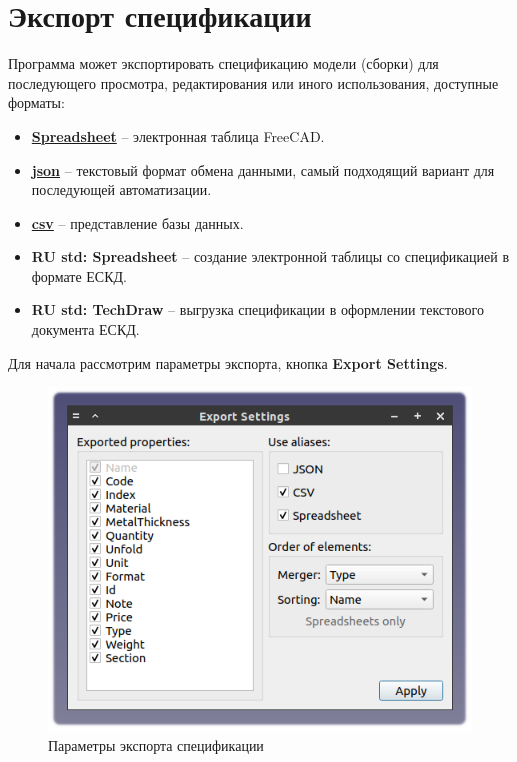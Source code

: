 \documentclass[a4paper,12pt]{article}
\begin{document}
\pagebreak




\section{Экспорт спецификации}

Программа может экспортировать спецификацию модели (сборки) для последующего просмотра, редактирования или иного использования, доступные форматы:

\begin{itemize}
	\item \href{https://wiki.freecad.org/Spreadsheet_Workbench}{\textbf{Spreadsheet}} -- электронная таблица FreeCAD.
	\item \href{https://ru.wikipedia.org/wiki/JSON}{\textbf{json}} --  текстовый формат обмена данными, самый подходящий вариант для последующей автоматизации.
	\item \href{https://ru.wikipedia.org/wiki/CSV}{\textbf{csv}} -- представление базы данных.
	\item \textbf{RU std: Spreadsheet} -- создание электронной таблицы со спецификацией в формате ЕСКД.
	\item \textbf{RU std: TechDraw} -- выгрузка спецификации в оформлении текстового документа ЕСКД.\\
\end{itemize}

\begin{flushleft}Для начала рассмотрим параметры экспорта, кнопка \textbf{Export Settings}.\end{flushleft}

\begin{figure}[htp]
	\centering
	\includegraphics[scale=1]{img/specification_export.png}
	\caption{Параметры экспорта спецификации}
	\label{sec:specification_export}
\end{figure}
\end{document}
